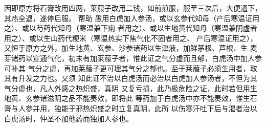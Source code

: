 \documentclass[a4paper,12pt,UTF8,twoside]{ctexbook}
\begin{document}
因即原方将石膏改用四两，莱菔子改用二钱，如前煎服，服至三次后，大便通下，其热全退，遂停后服。 
帮助 愚用白虎加人参汤，或以玄参代知母（产后寒温证用之）、或以芍药代知母（寒温兼下痢 
者用之）、或以生地黄代知母（寒温兼阴虚者用之）、或以生山药代粳米（寒温热实下焦气化不固者用之、 
产后寒温证用之），又恒于原方之外，加生地黄、玄参、沙参诸药以生津液，加鲜茅根、芦根、生 
麦芽诸药以宣通气化，初未有加莱菔子者，惟此证之气分虚而且郁，白虎汤中加人参可补其 
气分之虚，再加莱菔子更可理其气分之郁也。至于莱菔子必须生用者，取其有升发之力也。又须 
知此证不治以白虎汤而必治以白虎加人参汤者，不但为其气分虚也，凡人外感之热炽盛，真阴 
又复亏损，此乃极危险之证，此时若但用生地黄、玄参诸滋阴之品不能奏效，即将此 
等药加于白虎汤中亦不能奏效，惟生石膏与人参并用，独能于邪热炽盛之时立复真阴，此所 
以伤寒汗吐下后与渴者治以白虎汤时，仲圣不加他药而独加人参也。 
\end{document}

